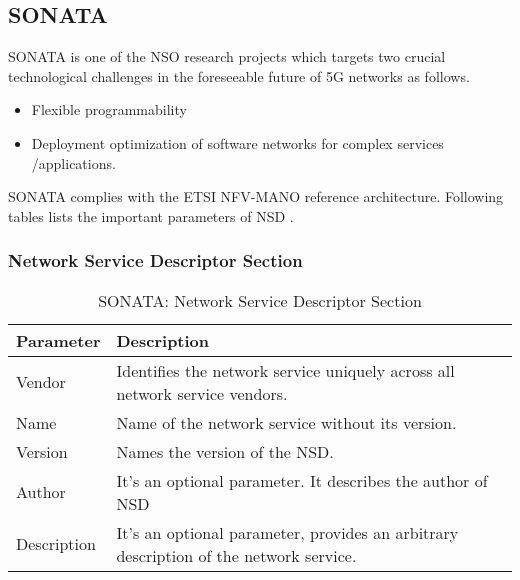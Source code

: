 \subsection{SONATA}
\label{SecSONATA}
SONATA is one of the NSO research projects which targets two crucial technological challenges in the foreseeable future of 5G networks as follows\cite{SONATA}.
\begin{itemize}
    \item Flexible programmability
    \item Deployment optimization of software networks for complex services /applications.
\end{itemize}
SONATA complies with the ETSI NFV-MANO reference architecture. Following tables lists the important parameters of NSD \cite{SONATASchemaDocumentation}.
\subsubsection{Network Service Descriptor Section}
    \begin{table}[h]
    \centering
    \begin{tabular}{ |p{4cm}|p{10cm}|}
        \hline
        \textbf{Parameter} & \textbf{Description} \\
        \hline
         
         Vendor & Identifies the network service uniquely across all network service vendors. \\
         \hline
         Name & Name of the network service without its version. \\
         \hline
         Version & Names the version of the NSD. \\
         \hline
         Author & It's an optional parameter. It describes the author of NSD \\
         \hline
         Description & It's an optional parameter, provides an arbitrary description of the network service. \\
         \hline
    \end{tabular}
    \caption{SONATA: Network Service Descriptor Section}
    \label{tab:SONATA_general_section}
\end{table}
